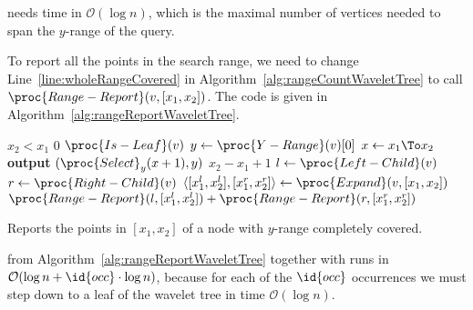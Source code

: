 \begin{Proof}
   needs time in $\mathcal{O}(\log n)$, which is the maximal number of vertices needed to span the $y$-range of the query.

  To report all the points in the search range, we need to change Line~\ref{line:wholeRangeCovered} in Algorithm~\ref{alg:rangeCountWaveletTree} to call $\proc{Range-Report}(v, [x_1, x_2])$. The code is given in Algorithm~\ref{alg:rangeReportWaveletTree}.

  \begin{algorithm}[htb]
    \begin{codebox}
      \li \If $x_2 < x_1$
          \Then
      \li   \Return $0$
          \End
      \li \If $\proc{Is-Leaf}(v)$
          \Then
      \li   $y \gets \proc{Y-Range}(v)[0]$
      \li   \For $x \gets x_1 \To x_2$
            \Do
      \li     \textbf{output} $(\proc{Select}_y(x + 1), y)$
            \End
      \li   \Return $x_2 - x_1 + 1$
      \li \Else
      \li   $l \gets \proc{Left-Child}(v)$
      \li   $r \gets \proc{Right-Child}(v)$
      \li   $\langle [x_1^l, x_2^l], [x_1^r, x_2^r] \rangle \gets \proc{Expand}(v, [x_1, x_2])$
      \li   \Return $\proc{Range-Report}(l, [x_1^l, x_2^l]) + \proc{Range-Report}(r, [x_1^r, x_2^r])$
          \End
    \end{codebox}
    \caption{Reports the points in $[x_1, x_2]$ of a node with $y$-range completely covered.}
    \label{alg:rangeReportWaveletTree}
  \end{algorithm}

   from Algorithm~\ref{alg:rangeReportWaveletTree} together with  runs in $\mathcal{O}(\log n + \id{occ} \cdot \log n)$, because for each of the $\id{occ}$ occurrences we must step down to a leaf of the wavelet tree in time $\mathcal{O}(\log n)$.
\end{Proof}
